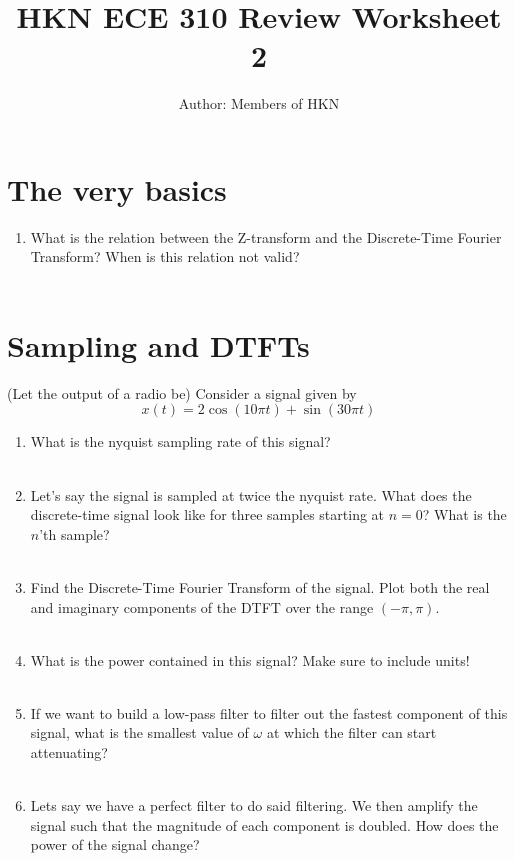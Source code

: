 \documentclass{article}
\title{HKN ECE 310 Review Worksheet 2}
\author{Author: Members of HKN }
\date{}
\begin{document}
\maketitle

\section{The very basics}
\begin{enumerate}
    \item What is the relation between the Z-transform and the Discrete-Time Fourier Transform? When is this relation not valid?\\\\

\end{enumerate}

\section{Sampling and DTFTs}
(Let the output of a radio be) Consider a signal given by
$$
x(t) = 2\cos(10\pi t) + \sin(30\pi t)
$$
\begin{enumerate}
    \item What is the nyquist sampling rate of this signal?\\\\
    
 

    \item Let's say the signal is sampled at twice the nyquist rate. What does the discrete-time signal look like for three samples starting at $n=0$? What is the $n$'th sample?\\\\
 
    \item Find the Discrete-Time Fourier Transform of the signal. Plot both the real and imaginary components of the DTFT over the range $(-\pi, \pi)$.\\\\

 


    \item What is the power contained in this signal? Make sure to include units!\\\\


 

    \item If we want to build a low-pass filter to filter out the fastest component of this signal, what is the smallest value of $\omega$ at which the filter can start attenuating? \\\\




    \item Lets say we have a perfect filter to do said filtering. We then amplify the signal such that the magnitude of each component is doubled. How does the power of the signal change?\\\\

    
\end{enumerate}
\end{document}
